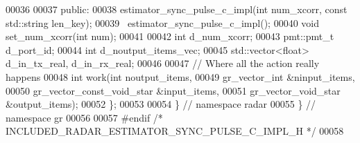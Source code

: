 \begin{DoxyCode}
00036 
00037      \textcolor{keyword}{public}:
00038       estimator_sync_pulse_c_impl(\textcolor{keywordtype}{int} num\_xcorr, \textcolor{keyword}{const} std::string len\_key);
00039       ~estimator_sync_pulse_c_impl();
00040       \textcolor{keywordtype}{void} set_num_xcorr(\textcolor{keywordtype}{int} num);
00041       
00042       \textcolor{keywordtype}{int} d_num_xcorr;
00043       pmt::pmt\_t d_port_id;
00044       \textcolor{keywordtype}{int} d_noutput_items_vec;
00045       std::vector<float> d_in_tx_real, d_in_rx_real;
00046 
00047       \textcolor{comment}{// Where all the action really happens}
00048       \textcolor{keywordtype}{int} work(\textcolor{keywordtype}{int} noutput\_items,
00049                gr\_vector\_int &ninput\_items,
00050                gr\_vector\_const\_void\_star &input\_items,
00051                gr\_vector\_void\_star &output\_items);
00052     \};
00053 
00054   \} \textcolor{comment}{// namespace radar}
00055 \} \textcolor{comment}{// namespace gr}
00056 
00057 \textcolor{preprocessor}{#endif }\textcolor{comment}{/* INCLUDED\_RADAR\_ESTIMATOR\_SYNC\_PULSE\_C\_IMPL\_H */}\textcolor{preprocessor}{}
00058 
\end{DoxyCode}
